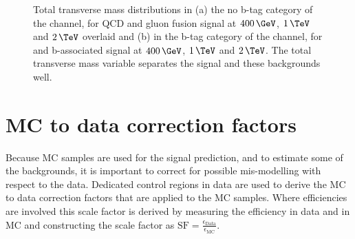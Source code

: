 \begin{figure}[h!]
\begin{center}
\end{center}
\caption[Total transverse mass distributions in the no b-tag category of the
\tautau channel for QCD and gluon fusion signal, and in the b-tag category
of the \emu channel, for \ttbar and b-associated signal.]{Total transverse mass distributions in (a) the no b-tag category of the \tautau
channel, for QCD and gluon fusion signal at $400\,\GeV$, $1\,\TeV$ and $2\,\TeV$ overlaid and (b) in the b-tag
category of the \emu channel, for \ttbar and b-associated signal at $400\,\GeV$, $1\,\TeV$ and $2\,\TeV$. 
The total transverse mass variable separates the signal and these backgrounds well.}
\label{fig:mttot_sigseps}
\end{figure}



\section{\acs{MC} to data correction factors}
\label{sec:mssm_mccorrs}
Because \ac{MC} samples are used for the signal prediction, and 
to estimate some of the backgrounds, it is important to correct for possible 
mis-modelling with respect to the data. Dedicated control regions in
data are used to derive the \ac{MC} to data correction factors
that are applied to the \ac{MC} samples. Where efficiencies
are involved this scale factor is derived by measuring the efficiency
in data and in \ac{MC} and constructing the scale factor as $\text{SF}=\frac{\epsilon_{\text{Data}}}{\epsilon_{\text{MC}}}$.
